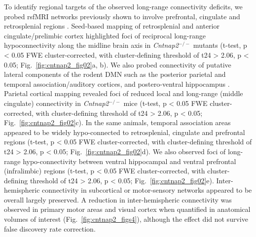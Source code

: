 To identify regional targets of the observed long-range connectivity deficits,
we probed rsfMRI networks previously shown to involve prefrontal, cingulate and
retrosplenial regions \parencite{sforazzini2014, gozzi2016}. Seed-based mapping
of retrosplenial and anterior cingulate/prelimbic cortex highlighted foci of
reciprocal long-range hypoconnectivity along the midline brain axis in
\textit{Cntnap2}$^{-/-}$ mutants (t-test, p < 0.05 FWE cluster-corrected, with
cluster-defining threshold of t24 > 2.06, p < 0.05;
Fig.~\ref{fig:cntnap2_fig02}a, b). We also probed connectivity of putative
lateral components of the rodent DMN such as the posterior parietal and temporal
association/auditory cortices, and postero-ventral hippocampus
\parencite{gozzi2016}. Parietal cortical mapping revealed foci of reduced local
and long-range (middle cingulate) connectivity in \textit{Cntnap2}$^{-/-}$ mice (t-test, p <
0.05 FWE cluster-corrected, with cluster-defining threshold of t24 > 2.06, p <
0.05; Fig.~\ref{fig:cntnap2_fig02}c). In the same animals, temporal association
areas appeared to be widely hypo-connected to retrosplenial, cingulate and
prefrontal regions (t-test, p < 0.05 FWE cluster-corrected, with
cluster-defining threshold of t24 > 2.06, p < 0.05;
Fig.~\ref{fig:cntnap2_fig02}d). We also observed foci of long-range
hypo-connectivity between ventral hippocampal and ventral prefrontal
(infralimbic) regions (t-test, p < 0.05 FWE cluster-corrected, with
cluster-defining threshold of t24 > 2.06, p < 0.05;
Fig.~\ref{fig:cntnap2_fig02}e). Inter-hemispheric connectivity in subcortical or
motor-sensory networks appeared to be overall largely preserved. A reduction in
inter-hemispheric connectivity was observed in primary motor areas and visual
cortex when quantified in anatomical volumes of interest
(Fig.~\ref{fig:cntnap2_figs4}), although the effect did not survive false
discovery rate correction.

